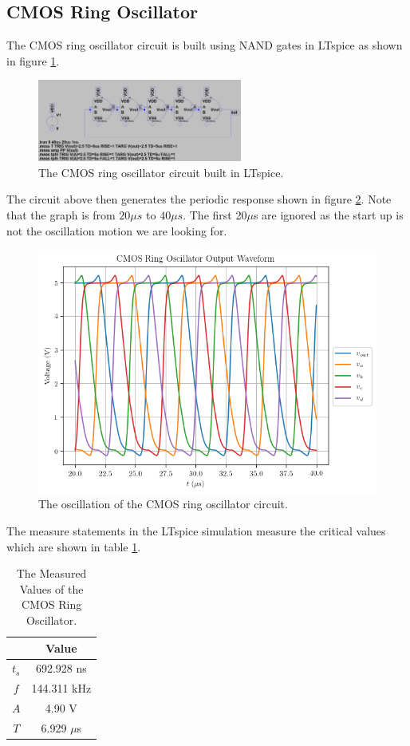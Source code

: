 \documentclass[titlepage, 12pt]{article}
\begin{document}
    \subsection{CMOS Ring Oscillator}
    The CMOS ring oscillator circuit is built using NAND gates in
    LTspice as shown in figure \ref{fig:ring_circuit}.
    \begin{figure}[H]
        \centering
        \includegraphics[width=0.6\textwidth]{figures/part_23_circuit.png}
        \caption{The CMOS ring oscillator circuit built in LTspice.}
        \label{fig:ring_circuit}
    \end{figure}
    The circuit above then generates the periodic response shown in
    figure \ref{fig:ring}. Note that the graph is from $20\mu s$ to
    $40\mu s$. The first 20$\mu$s are ignored as the start up is not the
    oscillation motion we are looking for.
    \begin{figure}[H]
        \centering
        \includegraphics[width=\textwidth]{figures/part_23.png}
        \caption{The oscillation of the CMOS ring oscillator circuit.}
        \label{fig:ring}
    \end{figure}
    The measure statements in the LTspice simulation measure the
    critical values which are shown in table \ref{tab:ring}.
    \begin{table}[H]
        \centering
        \caption{The Measured Values of the CMOS Ring Oscillator.}
        \label{tab:ring}
        \begin{tabular}{c|c}
            &Value\\
            \hline
            $t_s$ & 692.928 ns\\
            $f$ & 144.311 kHz\\
            $A$ & 4.90 V\\
            $T$ & 6.929 $\mu$s\\
        \end{tabular}
    \end{table}
\end{document}
